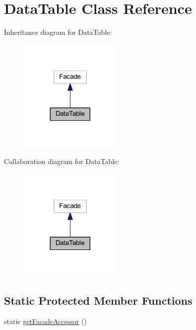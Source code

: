 \hypertarget{classhamburgscleanest_1_1_data_tables_1_1_facades_1_1_data_table}{}\section{Data\+Table Class Reference}
\label{classhamburgscleanest_1_1_data_tables_1_1_facades_1_1_data_table}


Inheritance diagram for Data\+Table\+:
\nopagebreak
\begin{figure}[H]
\begin{center}
\leavevmode
\includegraphics[width=140pt]{classhamburgscleanest_1_1_data_tables_1_1_facades_1_1_data_table__inherit__graph}
\end{center}
\end{figure}


Collaboration diagram for Data\+Table\+:
\nopagebreak
\begin{figure}[H]
\begin{center}
\leavevmode
\includegraphics[width=140pt]{classhamburgscleanest_1_1_data_tables_1_1_facades_1_1_data_table__coll__graph}
\end{center}
\end{figure}
\subsection*{Static Protected Member Functions}
\begin{DoxyCompactItemize}
\item 
static \hyperlink{classhamburgscleanest_1_1_data_tables_1_1_facades_1_1_data_table_a19a808201f41f32f71a0532cb49b450f}{get\+Facade\+Accessor} ()
\end{DoxyCompactItemize}


